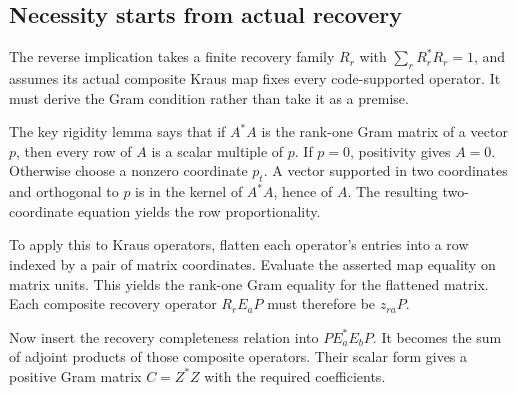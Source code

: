 

\subsection{Necessity starts from actual recovery}
The reverse implication takes a finite recovery family $R_r$ with $\sum_rR_r^*R_r=1$, and assumes its actual composite Kraus map fixes every code-supported operator. It must derive the Gram condition rather than take it as a premise.

The key rigidity lemma says that if $A^*A$ is the rank-one Gram matrix of a vector $p$, then every row of $A$ is a scalar multiple of $p$. If $p=0$, positivity gives $A=0$. Otherwise choose a nonzero coordinate $p_t$. A vector supported in two coordinates and orthogonal to $p$ is in the kernel of $A^*A$, hence of $A$. The resulting two-coordinate equation yields the row proportionality.


To apply this to Kraus operators, flatten each operator's entries into a row indexed by a pair of matrix coordinates. Evaluate the asserted map equality on matrix units. This yields the rank-one Gram equality for the flattened matrix. Each composite recovery operator $R_rE_aP$ must therefore be $z_{ra}P$.

Now insert the recovery completeness relation into $PE_a^*E_bP$. It becomes the sum of adjoint products of those composite operators. Their scalar form gives a positive Gram matrix $C=Z^*Z$ with the required coefficients.




